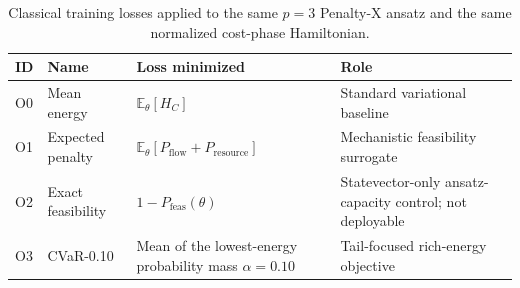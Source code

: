 
\begin{table}[t]
\centering
\caption{Classical training losses applied to the same $p=3$ Penalty-X ansatz and the same normalized cost-phase Hamiltonian.}
\label{tab:objectives}
\small
\begin{tabularx}{\textwidth}{@{}l>{\raggedright\arraybackslash}p{1.8cm}>{\raggedright\arraybackslash}p{5.0cm}X@{}}
\toprule
ID & Name & Loss minimized & Role \\
\midrule
O0 & Mean energy & $\mathbb{E}_{\theta}[H_C]$ & Standard variational baseline \\
O1 & Expected penalty & $\mathbb{E}_{\theta}[P_{\mathrm{flow}}+P_{\mathrm{resource}}]$ & Mechanistic feasibility surrogate \\
O2 & Exact feasibility & $1-P_{\mathrm{feas}}(\theta)$ & Statevector-only ansatz-capacity control; not deployable \\
O3 & CVaR-0.10 & Mean of the lowest-energy probability mass $\alpha=0.10$ & Tail-focused rich-energy objective \\
\bottomrule
\end{tabularx}
\end{table}
